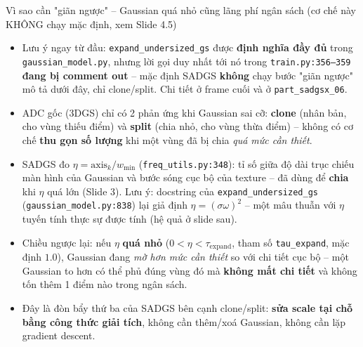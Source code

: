 
\begin{frame}{Vì sao cần "giãn ngược" -- Gaussian quá nhỏ cũng lãng phí ngân sách \alert{(cơ chế này KHÔNG chạy mặc định, xem Slide 4.5)}}
\footnotesize
\begin{itemize}
    \item \alert{Lưu ý ngay từ đầu:} \texttt{expand\_undersized\_gs} được \textbf{định nghĩa đầy đủ} trong \texttt{gaussian\_model.py}, nhưng lời gọi duy nhất tới nó trong \texttt{train.py:356--359} \textbf{đang bị comment out} -- mặc định SADGS \textbf{không} chạy bước "giãn ngược" mô tả dưới đây, chỉ clone/split. Chi tiết ở frame cuối và ở \texttt{part\_sadgsx\_06}.
    \item ADC gốc (3DGS) chỉ có 2 phản ứng khi Gaussian sai cỡ: \textbf{clone} (nhân bản, cho vùng thiếu điểm) và \textbf{split} (chia nhỏ, cho vùng thừa điểm) -- không có cơ chế \textbf{thu gọn số lượng} khi một vùng đã bị chia \emph{quá mức cần thiết}.
    \item SADGS đo $\eta = \text{axis}_k / w_{\min}$ (\texttt{freq\_utils.py:348}): tỉ số giữa độ dài trục chiếu màn hình của Gaussian và bước sóng cục bộ của texture -- đã dùng để \textbf{chia} khi $\eta$ quá lớn (Slide 3). \alert{Lưu ý:} docstring của \texttt{expand\_undersized\_gs} (\texttt{gaussian\_model.py:838}) lại giả định $\eta=(\sigma\omega)^2$ -- một mâu thuẫn với $\eta$ tuyến tính thực sự được tính (hệ quả ở slide sau).
    \item Chiều ngược lại: nếu $\eta$ \textbf{quá nhỏ} ($0 < \eta < \tau_{\text{expand}}$, tham số \texttt{tau\_expand}, mặc định $1.0$), Gaussian đang \emph{mờ hơn mức cần thiết} so với chi tiết cục bộ -- một Gaussian to hơn có thể phủ đúng vùng đó mà \textbf{không mất chi tiết} và không tốn thêm 1 điểm nào trong ngân sách.
    \item Đây là đòn bẩy thứ ba của SADGS bên cạnh clone/split: \textbf{sửa scale tại chỗ bằng công thức giải tích}, không cần thêm/xoá Gaussian, không cần lặp gradient descent.
\end{itemize}
\end{frame}

